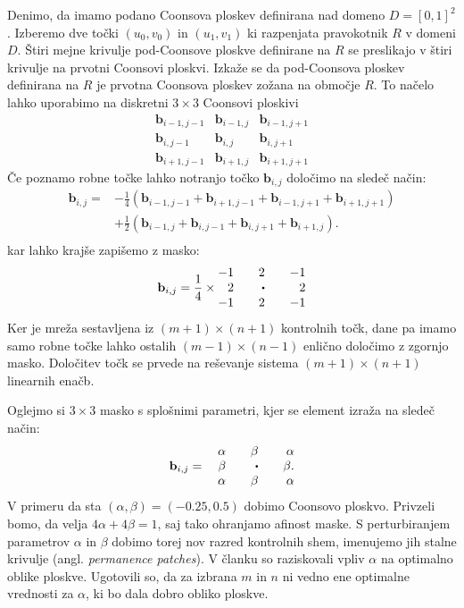 \documentclass[a4paper,12pt]{article}
\begin{document}
Denimo, da imamo podano Coonsova ploskev definirana nad domeno $D = [0,1]^2$. 
Izberemo dve točki $(u_0,v_0)$ in $(u_1,v_1)$ ki razpenjata pravokotnik $R$ v domeni $D$. 
Štiri mejne krivulje pod-Coonsove ploskve definirane na $R$ se preslikajo 
v štiri krivulje na prvotni Coonsovi ploskvi. Izkaže se da pod-Coonsova ploskev 
definirana na $R$ je prvotna Coonsova ploskev zožana na območje $R$. To načelo 
lahko uporabimo na diskretni $3 \times 3$ Coonsovi ploskivi
$$
\begin{matrix} 
   \mathbf{b}_{i-1,j-1} & \mathbf{b}_{i-1,j} & \mathbf{b}_{i-1,j+1}\\
   \mathbf{b}_{i,j-1} & \mathbf{b}_{i,j} & \mathbf{b}_{i,j+1}\\
   \mathbf{b}_{i+1,j-1} & \mathbf{b}_{i+1,j} & \mathbf{b}_{i+1,j+1}
\end{matrix}
$$ 
Če poznamo robne točke lahko notranjo točko $\mathbf{b}_{i,j}$ določimo na sledeč način: 
\begin{align*}
   \mathbf{b}_{i,j} =& -\frac{1}{4}(\mathbf{b}_{i-1,j-1} + \mathbf{b}_{i+1,j-1} +
      \mathbf{b}_{i-1,j+1} + \mathbf{b}_{i+1,j+1}) \\
      &+\frac{1}{2}(\mathbf{b}_{i-1,j} + \mathbf{b}_{i,j-1}+
      \mathbf{b}_{i,j+1} + \mathbf{b}_{i+1,j}).\\
\end{align*}
kar lahko krajše zapišemo z masko: 
$$
\mathbf{b}_{i,j} = \frac{1}{4} \times 
\begin{matrix*}[r]
-1 && 2 && -1 \\
2 && \sbullet && 2\\
-1 && 2 && -1
\end{matrix*}
$$
Ker je mreža sestavljena iz $(m+1)\times(n+1)$ kontrolnih točk, dane pa imamo samo robne
točke lahko ostalih $(m-1)\times(n-1)$ enlično določimo z zgornjo masko. Določitev točk se prvede
na reševanje sistema $(m+1)\times(n+1)$ linearnih enačb.

Oglejmo si $3 \times 3$ masko s splošnimi parametri, kjer se element izraža na sledeč način:
$$
\mathbf{b}_{i,j} =  \quad 
\begin{matrix*}[r]
\alpha && \beta && \alpha \\
\beta && \sbullet && \beta. \\
\alpha && \beta && \alpha
\end{matrix*}
$$
V primeru da sta $(\alpha, \beta) = (-0.25, 0.5)$ dobimo Coonsovo
ploskvo. Privzeli bomo, da velja $4\alpha + 4\beta = 1$, saj 
tako ohranjamo afinost maske. S perturbiranjem parametrov 
$\alpha$ in $\beta$ dobimo torej nov razred kontrolnih shem, imenujemo jih stalne 
krivulje (angl. \textit{permanence patches}). V članku \cite{DCP}  so raziskovali
vpliv $\alpha$ na optimalno oblike ploskve. Ugotovili so, da za izbrana $m$ in $n$
ni vedno ene optimalne vrednosti za $\alpha$, ki bo dala dobro obliko ploskve.
\end{document}
